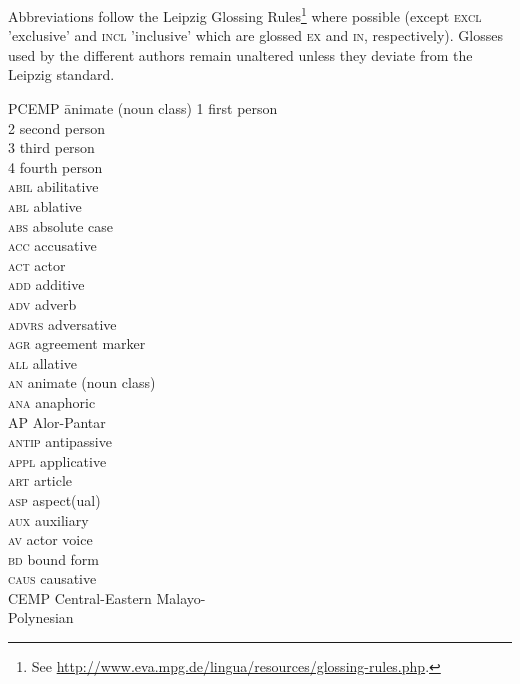 
Abbreviations follow the Leipzig Glossing Rules\footnote{See \url{http://www.eva.mpg.de/lingua/resources/glossing-rules.php}.} where possible (except \textsc{excl} 'exclusive' and \textsc{incl} 'inclusive' which are glossed \textsc{ex} and \textsc{in}, respectively). Glosses used by the different authors remain unaltered unless they deviate from the Leipzig standard.

\begin{multicols}{2}
\begin{tabbing}
  PCEMP \hspace{.5em} \= animate (noun class)\kill
 \textsc{1}  \> first person \\
 \textsc{2}  \> second person \\
 \textsc{3}  \> third person \\
 \textsc{4}  \> fourth person \\
 \textsc{abil}  \> abilitative \\
 \textsc{abl}  \> ablative \\
 \textsc{abs}  \> absolute case \\
 \textsc{acc}  \> accusative \\
 \textsc{act}  \> actor \\
 \textsc{add}  \> additive \\
 \textsc{adv}  \> adverb \\
 \textsc{advrs} \> adversative \\
 \textsc{agr}  \> agreement marker \\
 \textsc{all}  \> allative \\
 \textsc{an}  \> animate (noun class) \\
 \textsc{ana}  \> anaphoric \\
 \textsc{AP}  \> Alor-Pantar \\
 \textsc{antip}  \> antipassive \\
 \textsc{appl}  \> applicative \\
 \textsc{art}  \> article \\
 \textsc{asp}  \> aspect(ual) \\
 \textsc{aux}  \> auxiliary \\
 \textsc{av}  \> actor voice \\
 \textsc{bd}  \> bound form \\
 \textsc{caus}  \> causative \\
 \textsc{CEMP}  \> Central-Eastern Malayo-\\\>Polynesian \\

\end{tabbing}
\end{multicols}
